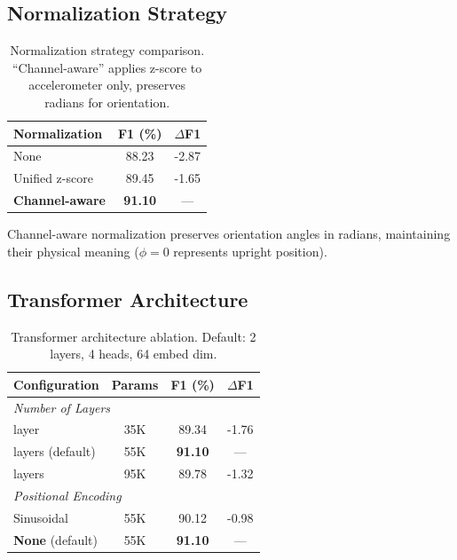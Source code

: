 \subsection{Normalization Strategy}
\label{app:normalization}

\begin{table}[H]
\caption{Normalization strategy comparison. ``Channel-aware'' applies z-score to accelerometer only, preserves radians for orientation.}
\label{tab:norm_ablation}
\centering
\begin{tabular}{lcc}
\toprule
\textbf{Normalization} & \textbf{F1 (\%)} & \textbf{$\Delta$F1} \\
\midrule
None & 88.23 & -2.87 \\
Unified z-score & 89.45 & -1.65 \\
\textbf{Channel-aware} & \textbf{91.10} & --- \\
\bottomrule
\end{tabular}
\end{table}

Channel-aware normalization preserves orientation angles in radians, maintaining their physical meaning ($\phi = 0$ represents upright position).

\subsection{Transformer Architecture}
\label{app:architecture}

\begin{table}[H]
\caption{Transformer architecture ablation. Default: 2 layers, 4 heads, 64 embed dim.}
\label{tab:arch_ablation}
\centering
\begin{tabular}{lccc}
\toprule
\textbf{Configuration} & \textbf{Params} & \textbf{F1 (\%)} & \textbf{$\Delta$F1} \\
\midrule
\multicolumn{4}{l}{\textit{Number of Layers}} \\
\quad 1 layer & 35K & 89.34 & -1.76 \\
\quad 2 layers (default) & 55K & \textbf{91.10} & --- \\
\quad 4 layers & 95K & 89.78 & -1.32 \\
\midrule
\multicolumn{4}{l}{\textit{Positional Encoding}} \\
\quad Sinusoidal & 55K & 90.12 & -0.98 \\
\quad \textbf{None} (default) & 55K & \textbf{91.10} & --- \\
\bottomrule
\end{tabular}
\end{table}

